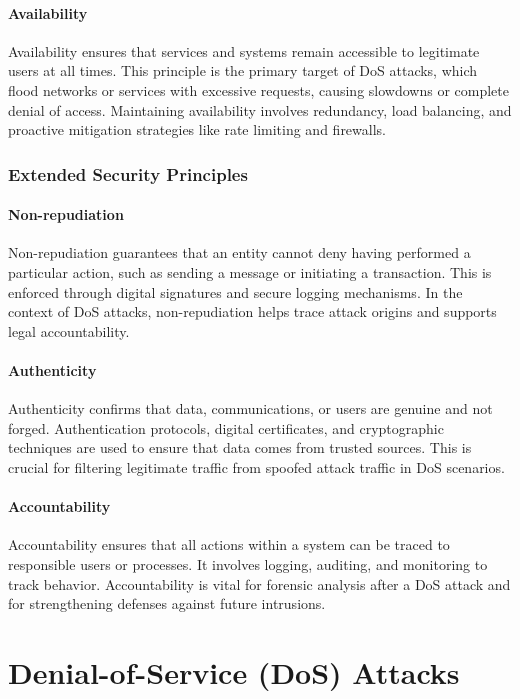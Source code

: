 \documentclass[16pt]{report}
\begin{document}
\paragraph{Availability} 
Availability ensures that services and systems remain accessible to legitimate users at all times. This principle is the primary target of DoS attacks, which flood networks or services with excessive requests, causing slowdowns or complete denial of access. Maintaining availability involves redundancy, load balancing, and proactive mitigation strategies like rate limiting and firewalls.

\subsubsection{Extended Security Principles}
\paragraph{Non-repudiation} 
Non-repudiation guarantees that an entity cannot deny having performed a particular action, such as sending a message or initiating a transaction. This is enforced through digital signatures and secure logging mechanisms. In the context of DoS attacks, non-repudiation helps trace attack origins and supports legal accountability.

\paragraph{Authenticity} 
Authenticity confirms that data, communications, or users are genuine and not forged. Authentication protocols, digital certificates, and cryptographic techniques are used to ensure that data comes from trusted sources. This is crucial for filtering legitimate traffic from spoofed attack traffic in DoS scenarios.

\paragraph{Accountability} 
Accountability ensures that all actions within a system can be traced to responsible users or processes. It involves logging, auditing, and monitoring to track behavior. Accountability is vital for forensic analysis after a DoS attack and for strengthening defenses against future intrusions.

\section{Denial-of-Service (DoS) Attacks}
\end{document}
